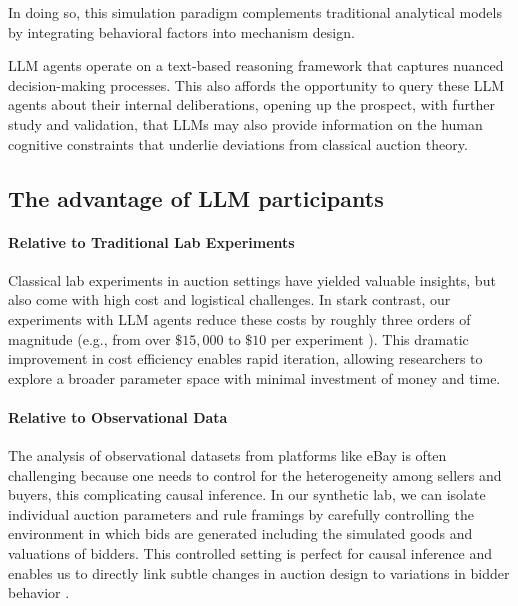 \documentclass{article} %
\newcommand{\kibitz}[2]{\ifnum\Comments=1{\color{#1}{#2}}\fi}
\newcommand{\dcp}[1]{\kibitz{teal}{[DCP: #1]}}
\newcommand{\kz}[1]{\kibitz{blue}{[kz: #1]}}
\begin{document}
In doing so, this
simulation paradigm complements traditional analytical models by integrating behavioral factors into mechanism design.

LLM agents operate on a text-based reasoning framework that captures nuanced decision-making processes. 
This also affords  the opportunity to query these  LLM agents about their internal deliberations, opening up the prospect, with further study and validation, that LLMs may also provide information on the human cognitive constraints that  underlie deviations from classical auction theory. 


\subsection{The advantage of LLM participants}
\paragraph{Relative to Traditional Lab Experiments}
Classical lab experiments in auction settings have yielded valuable insights, 
but also come with high cost and logistical challenges.
In stark contrast, our experiments with LLM agents reduce these costs by roughly three orders of magnitude (e.g., from over $\$15{,}000$ to  $\$10$ per experiment \citep{li2017obviously}). 
%
This dramatic improvement in cost efficiency enables rapid iteration, allowing researchers to explore a broader parameter space with minimal investment of money and time. 

\paragraph{Relative to Observational Data}
The analysis of observational datasets from platforms like eBay is often challenging because one
needs to control for the heterogeneity among sellers and buyers, this complicating causal inference.
%
In our synthetic lab, we can isolate individual auction parameters and rule framings by carefully 
controlling the environment in which bids are generated including the simulated goods and valuations of bidders. 
This controlled setting is perfect for
causal inference and enables us to directly link subtle changes in auction design to variations in bidder behavior \citep{manning2024automated}.
\end{document}
